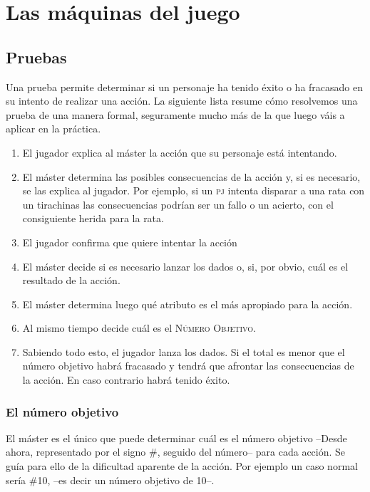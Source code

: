 \chapter{Las máquinas del juego}

\section{Pruebas}

Una prueba permite determinar si un personaje ha tenido éxito o ha fracasado en su intento de realizar una acción. La siguiente lista resume cómo resolvemos una prueba de una manera formal, seguramente mucho más de la que luego váis a aplicar en la práctica.

\begin{enumerate}
\item El jugador explica al máster la acción que su personaje está intentando.
\item El máster determina las posibles consecuencias de la acción y, si es necesario, se las explica al jugador. Por ejemplo, si un \textsc{pj} intenta disparar a una rata con un tirachinas las consecuencias podrían ser un fallo o un acierto, con el consiguiente herida para la rata.
\item El jugador confirma que quiere intentar la acción
\item El máster decide si es necesario lanzar los dados o, si, por obvio, cuál es el resultado de la acción.
\item El máster determina luego qué atributo es el más apropiado para la acción.
\item Al mismo tiempo decide cuál es el \textsc{Número Objetivo}.
\item Sabiendo todo esto, el jugador lanza los dados. Si el total es menor que el número objetivo habrá fracasado y tendrá que afrontar las consecuencias de la acción. En caso contrario habrá tenido éxito.
\end{enumerate}

\subsection{El número objetivo}
El máster es el único que puede determinar cuál es el número objetivo --Desde ahora, representado por el signo \#, seguido del número--  para cada acción. Se guía para ello de la dificultad aparente de la acción. Por ejemplo un caso normal sería \#10, --es decir un número objetivo de 10--.

